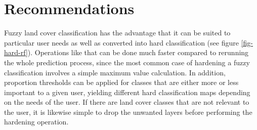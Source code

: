 \documentclass[a4paper,12pt]{scrbook}
\begin{document}
\section{Recommendations}

Fuzzy land cover classification has the advantage that it can be suited to particular user needs as well as converted into hard classification (see figure \ref{fig-hard-rf}). Operations like that can be done much faster compared to rerunning the whole prediction process, since the most common case of hardening a fuzzy classification involves a simple maximum value calculation. In addition, proportion thresholds can be applied for classes that are either more or less important to a given user, yielding different hard classification maps depending on the needs of the user. If there are land cover classes that are not relevant to the user, it is likewise simple to drop the unwanted layers before performing the hardening operation.
\end{document}

